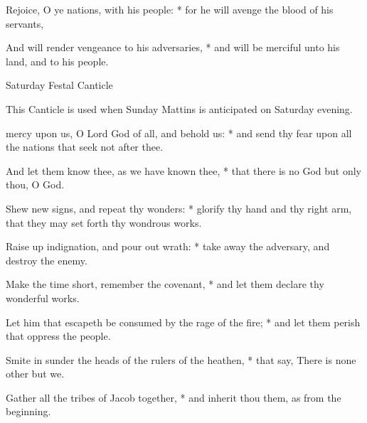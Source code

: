 \begin{multicols}{2}
Rejoice, O ye nations, with his people: * for he will avenge the blood of his servants,\par
And will render vengeance to his adversaries, * and will be merciful unto his land, and to his people.
\begin{inhead}
Saturday Festal Canticle
\end{inhead}
\begin{rubric}
    This Canticle is used when Sunday Mattins is anticipated on Saturday evening.
\end{rubric}
 mercy upon us, O Lord God of all, and behold us: * and send thy fear upon all the nations that seek not after thee.\par
{}
And let them know thee, as we have known thee, * that there is no God but only thou, O God.\par
Shew new signs, and repeat thy wonders: * glorify thy hand and thy right arm, that they may set forth thy wondrous works.\par
Raise up indignation, and pour out wrath: * take away the adversary, and destroy the enemy.\par
Make the time short, remember the covenant, * and let them declare thy wonderful works.\par
Let him that escapeth be consumed by the rage of the fire; * and let them perish that oppress the people.\par
Smite in sunder the heads of the rulers of the heathen, * that say, There is none other but we.\par
Gather all the tribes of Jacob together, * and inherit thou them, as from the beginning.
\end{multicols}